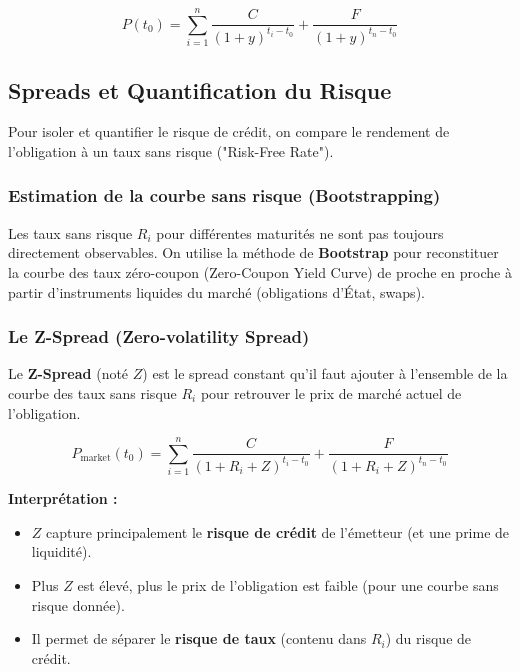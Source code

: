 \begin{equation}
    P(t_0) = \sum_{i=1}^n \frac{C}{(1+y)^{t_i - t_0}} + \frac{F}{(1+y)^{t_n - t_0}}
\end{equation}

\subsection{Spreads et Quantification du Risque}

Pour isoler et quantifier le risque de crédit, on compare le rendement de l'obligation à un taux sans risque ("Risk-Free Rate").

\subsubsection{Estimation de la courbe sans risque (Bootstrapping)}

Les taux sans risque $R_i$ pour différentes maturités ne sont pas toujours directement observables. On utilise la méthode de \textbf{Bootstrap} pour reconstituer la courbe des taux zéro-coupon (Zero-Coupon Yield Curve) de proche en proche à partir d'instruments liquides du marché (obligations d'État, swaps).

\subsubsection{Le Z-Spread (Zero-volatility Spread)}

Le \textbf{Z-Spread} (noté $Z$) est le spread constant qu'il faut ajouter à l'ensemble de la courbe des taux sans risque $R_i$ pour retrouver le prix de marché actuel de l'obligation.

\begin{equation}
    P_{\text{market}}(t_0) = \sum_{i=1}^n \frac{C}{(1 + R_i + Z)^{t_i - t_0}} + \frac{F}{(1 + R_i + Z)^{t_n - t_0}}
\end{equation}

\textbf{Interprétation :}
\begin{itemize}
    \item $Z$ capture principalement le \textbf{risque de crédit} de l'émetteur (et une prime de liquidité).
    \item Plus $Z$ est élevé, plus le prix de l'obligation est faible (pour une courbe sans risque donnée).
    \item Il permet de séparer le \textbf{risque de taux} (contenu dans $R_i$) du risque de crédit.
\end{itemize}

